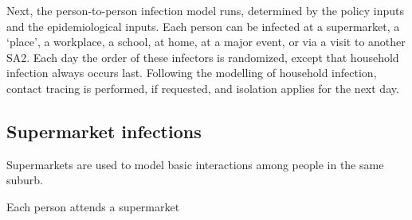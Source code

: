 \documentclass[a4paper,11pt]{scrreprt}
\begin{document}
Next, the person-to-person infection model runs, determined by the policy inputs and
the epidemiological inputs. Each person can be infected at a supermarket, a `place', 
a workplace, a school, at home, at a major event, or via a visit to another SA2. Each day
the order of these infectors is randomized, except that household infection always
occurs last. Following the modelling of household infection, contact tracing is performed,
if requested, and isolation applies for the next day.

\subsection{Supermarket infections}

Supermarkets are used to model basic interactions among people in the same suburb. 

Each person attends a supermarket 
\end{document}
